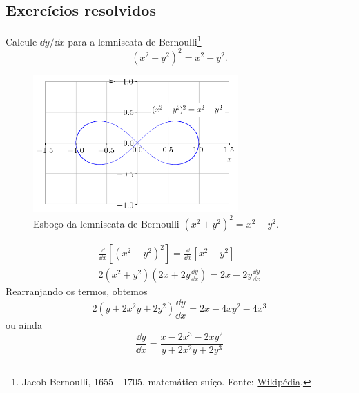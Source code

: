 \subsection*{Exercícios resolvidos}

\begin{exeresol}
  Calcule $\dd y/\dd x$ para a lemniscata de Bernoulli\footnote{Jacob Bernoulli, 1655 - 1705, matemático suíço. Fonte: \href{https://pt.wikipedia.org/wiki/Jakob_Bernoulli}{Wikipédia}.}
  \begin{equation}
    (x^2 + y^2)^2 = x^2 - y^2.
  \end{equation}
  \begin{figure}[H]
    \centering
    \includegraphics[width=0.7\textwidth]{./cap_deriv/dados/fig_lemniscata/fig}
    \caption{Esboço da lemniscata de Bernoulli $(x^2+y^2)^2 = x^2 - y^2$.}
    \label{fig:lemniscata}
  \end{figure}
\end{exeresol}
\begin{resol}
  \begin{gather}
    \frac{\dd}{\dd x}\left[(x^2 + y^2)^2\right] = \frac{\dd}{\dd x}\left[x^2 - y^2\right]\\
    2(x^2 + y^2)\left(2x + 2y\frac{\dd y}{\dd x}\right) = 2x - 2y\frac{\dd y}{\dd x}
  \end{gather}
  Rearranjando os termos, obtemos
  \begin{equation}
    2(y + 2x^2y + 2y^2)\frac{\dd y}{\dd x} = 2x - 4xy^2 - 4x^3
  \end{equation}
  ou ainda
  \begin{equation}
    \frac{\dd y}{\dd x} = \frac{x - 2x^3 - 2xy^2}{y + 2x^2y + 2y^3}
  \end{equation}
\end{resol}

